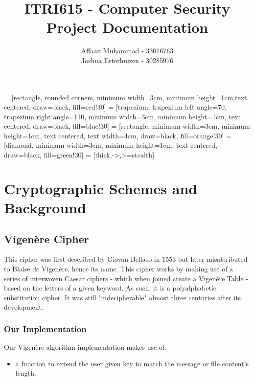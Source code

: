 \documentclass[a4paper, 12pt, titlepage]{report}
\begin{document}
 = [rectangle, rounded corners, minimum width=3cm, minimum height=1cm,text centered, draw=black, fill=red!30]
 = [trapezium, trapezium left angle=70, trapezium right angle=110, minimum width=3cm, minimum height=1cm, text centered, draw=black, fill=blue!30]
 = [rectangle, minimum width=3cm, minimum height=1cm, text centered, text width=4cm, draw=black, fill=orange!30]
 = [diamond, minimum width=3cm, minimum height=1cm, text centered, draw=black, fill=green!30]
 = [thick,->,>=stealth]
\linespread{1.25}
\author{Affaan Muhammad - 33016763\\Joshua Esterhuizen - 30285976}
\title{ITRI615 - Computer Security\\Project Documentation}
\date{}
\maketitle
\tableofcontents{}
\chapter{Cryptographic Schemes and Background}
\section{Vigenère Cipher}
This cipher was first described by Giovan Bellaso in 1553 but later misattributed to Blaise de Vigenère, hence its name. This cipher works by making use of a series of interwoven Caesar ciphers - which when joined create a Vigenère Table - based on the letters of a given keyword. As such, it is a polyalphabetic substitution cipher. It was still "indecipherable" almost three centuries after its development.
\subsection{Our Implementation}
Our Vigenère algorithm implementation makes use of:
\begin{itemize}
\item a function to extend the user given key to match the message or file content's length.
\end{itemize}
\end{document}
